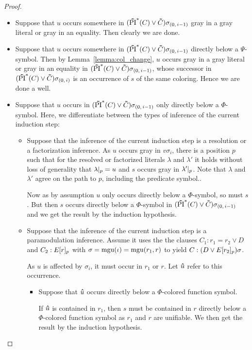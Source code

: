 \begin{proof}
\begin{itemize}
			\begin{itemize}
				\item Suppose that $u$ occurs somewhere in $(\bm\tilde{\operatorname{PI}}^{*}(C)\lor \bm\tilde{C})\sigma_{(0,\,i-1)}$ gray in a gray literal or gray in an equality. Then clearly we are done.
				\item Suppose that $u$ occurs somewhere in $(\bm\tilde{\operatorname{PI}}^{*}(C)\lor \bm\tilde{C})\sigma_{(0,\,i-1)}$ directly below a $\Psi$-symbol.
					Then by Lemma~\ref{lemma:col_change}, $u$ occurs gray in a gray literal or gray in an equality in $(\bm\tilde{\operatorname{PI}}^{*}(C)\lor \bm\tilde{C})\sigma_{(0,\,i-1)}$, whose successor in $(\bm\tilde{\operatorname{PI}}^{*}(C)\lor \bm\tilde{C})\sigma_{(0,\,i)}$ is an occurrence of $s$ of the same coloring. Hence we are done a well.
				\item Suppose that $u$ occurs in $(\bm\tilde{\operatorname{PI}}^{*}(C)\lor \bm\tilde{C})\sigma_{(0,\,i-1)}$ only directly below a $\Phi$-symbol.
					Here, we differentiate between the types of inference of the current induction step:

					\begin{itemize}
						\item
							Suppose that the inference of the current induction step is a resolution or a factorization inference.
							As $u$ occurs gray in $v\sigma_i$, there is a position $p$ such that for the resolved or factorized literals $\lambda$ and $\lambda'$ it holds without loss of generality that $\lambda|_{p} = u$ and $s$ occurs gray in $\lambda'|_{p}$.
							Note that $\lambda$ and $\lambda'$ agree on the path to $p$, including the predicate symbol..

							Now as by assumption $u$ only occurs directly below a $\Phi$-symbol, so must $s$.
							But then $s$ occurs directly below a $\Phi$-symbol in $(\bm\tilde{\operatorname{PI}}^{*}(C)\lor \bm\tilde{C})\sigma_{(0,\,i-1)}$ and we get the result by the induction hypothesis.

						\item
							Suppose that the inference of the current induction step is a paramodulation inference.
							Assume it uses the the clauses $C_1: r_1=r_2 \lor D$ and $C_2: E{[r]_{p}}$ with $\sigma=\operatorname{mgu}(\iota)=\operatorname{mgu}(r_1, r)$ to yield $C: (D\lor E{[r_2]_{p}})\sigma$.

							As $u$ is affected by $\sigma_i$, it must occur in $r_1$ or $r$. Let $\bm\hat u$ refer to this occurrence.

							\begin{itemize}
								\item
									Suppose that $\bm\hat u$ occurs directly below a $\Phi$-colored function symbol. 

									If $\bm\hat u$ is contained in $r_1$, then $s$ must be contained in $r$ directly below a $\Phi$-colored function symbol as $r_1$ and $r$ are unifiable. We then get the result by the induction hypothesis.


\end{itemize}
\end{itemize}
\end{itemize}
\end{itemize}
\end{proof}
